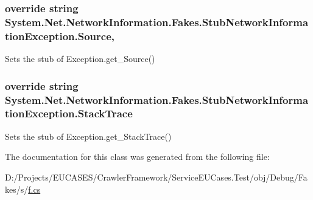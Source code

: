 \hypertarget{class_system_1_1_net_1_1_network_information_1_1_fakes_1_1_stub_network_information_exception_a8722dd8a1a22e9705f876c28a704ae56}{
\subsubsection[{Source}]{\setlength{\rightskip}{0pt plus 5cm}override string System.\-Net.\-Network\-Information.\-Fakes.\-Stub\-Network\-Information\-Exception.\-Source\hspace{0.3cm}{\ttfamily [get]}, {\ttfamily [set]}}}\label{class_system_1_1_net_1_1_network_information_1_1_fakes_1_1_stub_network_information_exception_a8722dd8a1a22e9705f876c28a704ae56}


Sets the stub of Exception.\-get\-\_\-\-Source()

\hypertarget{class_system_1_1_net_1_1_network_information_1_1_fakes_1_1_stub_network_information_exception_a87a5d3f144018f659a1d517f28897705}{
\subsubsection[{Stack\-Trace}]{\setlength{\rightskip}{0pt plus 5cm}override string System.\-Net.\-Network\-Information.\-Fakes.\-Stub\-Network\-Information\-Exception.\-Stack\-Trace\hspace{0.3cm}{\ttfamily [get]}}}\label{class_system_1_1_net_1_1_network_information_1_1_fakes_1_1_stub_network_information_exception_a87a5d3f144018f659a1d517f28897705}


Sets the stub of Exception.\-get\-\_\-\-Stack\-Trace()



The documentation for this class was generated from the following file\-:\begin{DoxyCompactItemize}
\item 
D\-:/\-Projects/\-E\-U\-C\-A\-S\-E\-S/\-Crawler\-Framework/\-Service\-E\-U\-Cases.\-Test/obj/\-Debug/\-Fakes/s/\hyperlink{s_2f_8cs}{f.\-cs}\end{DoxyCompactItemize}
